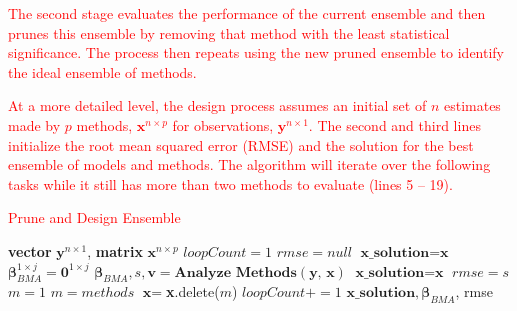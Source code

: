 \documentclass[journal=jpcbfk, manuscript=article]{achemso}
\newcommand{\+}[1]{\ensuremath{\mathbf{#1}}}
\newcommand{\rev}[1]{\textsf{\textcolor{red}{#1}}}
\begin{document}
\rev{The second stage evaluates the performance of the current ensemble and then prunes this ensemble by removing that method with the least statistical significance.
The process then repeats using the new pruned ensemble to identify the ideal ensemble of methods.}

\rev{At a more detailed level, the design process assumes an initial set of $n$ estimates made by $p$ methods, $\textbf{x}^{n \times p}$ for observations, $\textbf{y}^{n \times 1}$.
The second and third lines initialize the root mean squared error (RMSE) and the solution for the best ensemble of models and methods.
The algorithm will iterate over the following tasks while it still has more than two methods to evaluate (lines 5 -- 19).}

\begin{table}[t] 
	\begin{minipage}[t]{0.45\linewidth}\centering 
		\begin{algorithm}[H] 
			\footnotesize 
			\caption{\newline \rev{Prune and Design Ensemble}} \label{Method:Alg1} 
			\begin{algorithmic}[1] 
				{\scriptsize 
				\REQUIRE \textbf{vector} $\textbf{y}^{n \times 1}$, \textbf{matrix} $\textbf{x}^{n \times p}$\; 
				\vspace{2.5mm} 
				\STATE $loopCount = 1$\; 
				\STATE $rmse = null$\; 
				\STATE $\textbf{x\_solution} = \textbf{x}$\; 
				\STATE $\boldsymbol{\beta}_{BMA}^{1 \times j} = \textbf{0}^{1 \times j}$ \; 
				\; 
					\STATE $\boldsymbol{\beta}_{BMA}, s, \textbf{v} = \textbf{Analyze Methods}(\textbf{y, x})$\; 
					\; 
						\STATE $\textbf{x\_solution} = \textbf{x}$\; 
						\STATE $rmse = s$\; 
					\ENDIF\; 
					\STATE $m = 1$\; 
					\; 
						\; 
							\STATE $m = methods$\;
						\ENDIF\;
					\ENDFOR\;
					\STATE $\textbf{x} = $\textbf{x}.delete($m$)
					\;
					\STATE $loopCount += 1$\;
				\ENDWHILE\;
				\RETURN $\textbf{x\_solution},\boldsymbol{\beta}_{BMA}$, rmse\;} 
			\end{algorithmic}
		\end{algorithm}
	\end{minipage}
	\hspace{0.5cm}
	\begin{minipage}[t]{0.45\linewidth}

\end{minipage}
\end{table}
\end{document}
